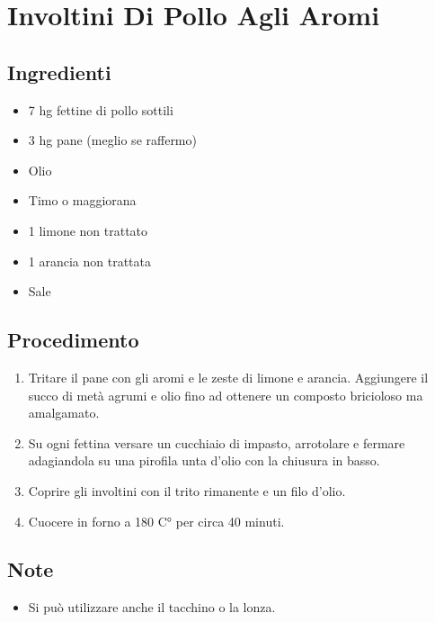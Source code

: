 \section{Involtini Di Pollo Agli Aromi}
\subsection{Ingredienti}
\begin{itemize}
\item 7 hg fettine di pollo sottili  
\item 3 hg pane (meglio se raffermo)  
\item Olio  
\item Timo o maggiorana  
\item 1 limone non trattato  
\item 1 arancia non trattata   
\item Sale
\end{itemize}
\subsection{Procedimento}
\begin{enumerate}
\item  Tritare il pane con gli aromi e le zeste di limone e arancia. Aggiungere il succo di metà agrumi e olio fino ad ottenere un composto bricioloso ma amalgamato.  
\item  Su ogni fettina versare un cucchiaio di impasto, arrotolare e fermare adagiandola su una pirofila unta d'olio con la chiusura in basso.  
\item  Coprire gli involtini con il trito rimanente e un filo d'olio.  
\item  Cuocere in forno a 180 C° per circa 40 minuti.
\end{enumerate}
\subsection{Note}
\begin{itemize}
\item Si può utilizzare anche il tacchino o la lonza.
\end{itemize}
